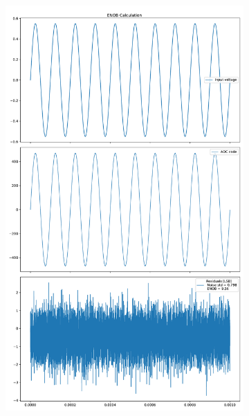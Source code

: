 \documentclass[varwidth]{standalone}
\begin{document}
\begin{figure}
\begin{subfigure}{0.32\textwidth}
    \includegraphics[width=\textwidth]{behavioral_10b_devnoise_enob.pdf}
\end{subfigure}
\begin{subfigure}{0.32\textwidth}
    \begin{table}
    \let\center\empty
    \let\endcenter\relax
    \centering
    \resizebox{0.3\width}{!}{}
    \end{table}

\end{subfigure}
\end{figure}
\end{document}

